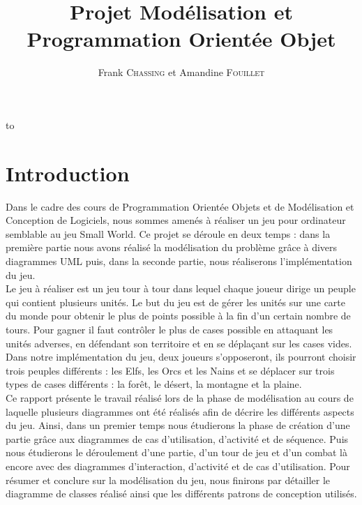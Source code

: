\documentclass[a4paper,11pt]{article}
\author{}
\title{}
\title{\LARGE{Projet Modélisation et Programmation Orientée Objet}}
\author{Frank \textsc{Chassing} et Amandine \textsc{Fouillet}}
\makeatletter
\def\clap#1{\hbox to 0pt{\hss #1\hss}}%
\def\haut#1#2#3{%
\hbox to \hsize{%
\rlap{\vtop{\raggedright #1}}%
\hss
\clap{\vtop{\centering #2}}%
\hss
\llap{\vtop{\raggedleft #3}}}}%
\def\bas#1#2#3{%
\hbox to \hsize{%
\rlap{\vbox{\raggedright #1}}%
\hss
\clap{\vbox{\centering #2}}%
\hss
\llap{\vbox{\raggedleft #3}}}}%
\def\maketitle{%
\thispagestyle{empty}\vbox to \vsize{%
\haut{}{\@blurb}{}
\vfill
\vspace{1cm}
\begin{flushleft}
\usefont{OT1}{ptm}{m}{n}
\huge \@title
\end{flushleft}
\par
\hrule height 4pt
\par
\begin{flushright}
\usefont{OT1}{phv}{m}{n}
\Large \@author
\par
\end{flushright}
\vspace{1cm}
\vfill
\vfill
\bas{}{\@location, le \@date}{}
}%
\cleardoublepage
}
\makeatother
\begin{document}
\maketitle
\tableofcontents
\newpage

\section*{Introduction}
	Dans le cadre des cours de Programmation Orientée Objets et de Modélisation et Conception de Logiciels, nous sommes amenés à réaliser un jeu pour ordinateur semblable au jeu Small World. Ce projet se déroule en deux temps : dans la première partie nous avons réalisé la modélisation du problème grâce à divers diagrammes UML puis, dans la seconde partie, nous réaliserons l'implémentation du jeu. \\

	Le jeu à réaliser est un jeu tour à tour dans lequel chaque joueur dirige un peuple qui contient plusieurs unités. Le but du jeu est de gérer les unités sur une carte du monde pour obtenir le plus de points possible à la fin d'un certain nombre de tours. Pour gagner il faut contrôler le plus de cases possible en attaquant les unités adverses, en défendant son territoire et en se déplaçant sur les cases vides. Dans notre implémentation du jeu, deux joueurs s'opposeront, ils pourront choisir trois peuples différents : les Elfs, les Orcs et les Nains et se déplacer sur trois types de cases différents : la forêt, le désert, la montagne et la plaine.\\

	Ce rapport présente le travail réalisé lors de la phase de modélisation au cours de laquelle plusieurs diagrammes ont été réalisés afin de décrire les différents aspects du jeu. Ainsi, dans un premier temps nous étudierons la phase de création d'une partie grâce aux diagrammes de cas d'utilisation, d'activité et de séquence. Puis nous étudierons le déroulement d'une partie, d'un tour de jeu et d'un combat là encore avec des diagrammes d'interaction, d'activité et de cas d'utilisation. Pour résumer et conclure sur la modélisation du jeu, nous finirons par détailler le diagramme de classes réalisé ainsi que les différents patrons de conception utilisés.
	\newpage
\end{document}
